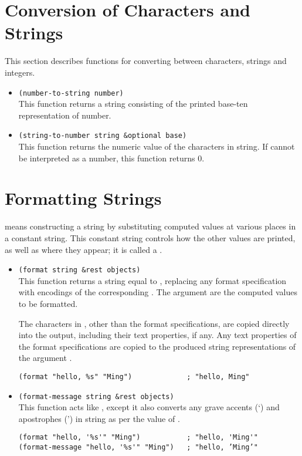 \section{Conversion of Characters and Strings}
\label{sec:conv-char-strings}

This section describes functions for converting between characters, strings and integers.

\begin{itemize}[itemsep=10pt]
\item \lstinline|(number-to-string number)|\\
  This function returns a string consisting of the printed base-ten representation of number.
\item \lstinline|(string-to-number string &optional base)|\\
  This function returns the numeric value of the characters in string.
  If  cannot be interpreted as a number, this function returns 0.
  
\end{itemize}

\section{Formatting Strings}
\label{sec:formatting-strings}

 means constructing a string by substituting computed values at various places in a constant string.
This constant string controls how the other values are printed, as well as where they appear; it is called a .

\begin{itemize}[itemsep=10pt]
\item \lstinline|(format string &rest objects)|\\
  This function returns a string equal to , replacing any format specification with encodings of the corresponding .
  The argument  are the computed values to be formatted.

  The characters in , other than the format specifications, are copied directly into the output, including their text properties, if any.
  Any text properties of the format specifications are copied to the produced string representations of the argument .

\begin{lstlisting}
(format "hello, %s" "Ming")             ; "hello, Ming"
\end{lstlisting}

\item \lstinline|(format-message string &rest objects)|\\
  This function acts like , except it also converts any grave accents (‘) and apostrophes (’) in string as per the value of .
\begin{lstlisting}
(format "hello, '%s'" "Ming")           ; "hello, 'Ming'"
(format-message "hello, '%s'" "Ming")   ; "hello, ’Ming’"
\end{lstlisting}
\end{itemize}



